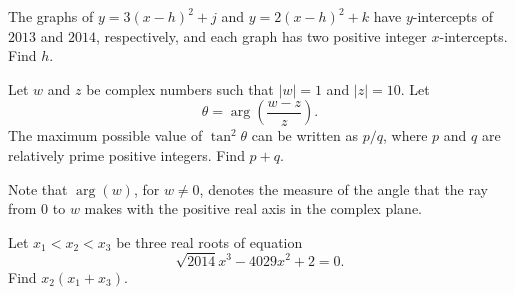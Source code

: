 \begin{question}[name={2014 AIME I, \href{https://artofproblemsolving.com/community/c4p3428736}{Problem 6}}]
	The graphs of $y=3(x-h)^2+j$ and $y=2(x-h)^2+k$ have $y$-intercepts of $2013$ and $2014$, respectively, and each graph has two positive integer $x$-intercepts. Find $h$.	
	
\end{question}


%	












\begin{question}[name={2014 AIME I, \href{https://artofproblemsolving.com/community/c4p3428814}{Problem 7}}]
	Let $w$ and $z$ be complex numbers such that $|w| = 1$ and $|z| = 10$. Let $$\theta = \arg\left(\frac{w-z}{z}\right).$$ The maximum possible value of $\tan^2 \theta$ can be written as ${p}/{q}$, where $p$ and $q$ are relatively prime positive integers. Find $p+q$. 
	
	Note that $\arg(w)$, for $w \neq 0$, denotes the measure of the angle that the ray from $0$ to $w$ makes with the positive real axis in the complex plane.
\end{question}


%	










\begin{question}[name={2014 AIME I, \href{https://artofproblemsolving.com/community/c4p3428727}{Problem 9}}]
	Let $x_1<x_2<x_3$ be three real roots of equation $$\sqrt{2014}x^3-4029x^2+2=0.$$ Find $x_2(x_1+x_3)$.
\end{question}


%	















